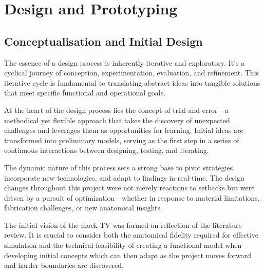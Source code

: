 \chapter{Design and Prototyping}\label{ch:DesProt}
\vspace{-2.5em}
{}\synopsisDesign{}
\mynewline
\section{Conceptualisation and Initial Design}
The essence of a design process is inherently iterative and exploratory. It's a cyclical journey of conception, experimentation, evaluation, and refinement. This iterative cycle is fundamental to translating abstract ideas into tangible solutions that meet specific functional and operational goals.

At the heart of the design process lies the concept of trial and error—a methodical yet flexible approach that takes the discovery of unexpected challenges and leverages them as opportunities for learning. Initial ideas are transformed into preliminary models, serving as the first step in a series of continuous interactions between designing, testing, and iterating.

The dynamic nature of this process sets a strong base to pivot strategies, incorporate new technologies, and adapt to findings in real-time. The design changes throughout this project were not merely reactions to setbacks but were driven by a pursuit of optimization—whether in response to material limitations, fabrication challenges, or new anatomical insights.


\mynewline
The initial vision of the mock \gls{TV} was formed on reflection of the literature review. It is crucial to consider both the anatomical fidelity required for effective simulation and the technical feasibility of creating a functional model when developing initial concepts which can then adapt as the project moves forward and harder boundaries are discovered.

